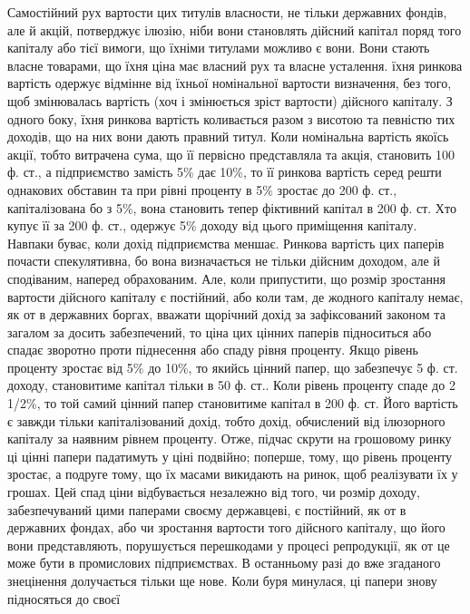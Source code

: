 Самостійний рух вартости цих титулів власности, не тільки державних
фондів, але й акцій, потверджує ілюзію, ніби вони становлять дійсний капітал
поряд того капіталу або тієї вимоги, що їхніми титулами можливо є вони.
Вони стають власне товарами, що їхня ціна має власний рух та власне усталення.
їхня ринкова вартість одержує відмінне від їхньої номінальної вартости
визначення, без того, щоб змінювалась вартість (хоч і змінюється зріст вартости)
дійсного капіталу. З одного боку, їхня ринкова вартість коливається разом з
висотою та певністю тих доходів, що на них вони дають правний титул. Коли
номінальна вартість якоїсь акції, тобто витрачена сума, що її первісно представляла
та акція, становить 100 ф. ст., а підприємство замість 5\% дає 10\%,
то її ринкова вартість серед решти однакових обставин та при рівні проценту
в 5\% зростає до 200 ф. ст., капіталізована бо з 5\%, вона становить тепер фіктивний
капітал в 200 ф. ст. Хто купує її за 200 ф. ст., одержує 5\% доходу
від цього приміщення капіталу. Навпаки буває, коли дохід підприємства меншає.
Ринкова вартість цих паперів почасти спекулятивна, бо вона визначається не
тільки дійсним доходом, але й сподіваним, наперед обрахованим. Але, коли припустити,
що розмір зростання вартости дійсного капіталу є постійний, або коли там,
де жодного капіталу немає, як от в державних боргах, вважати щорічний дохід
за зафіксований законом та загалом за досить забезпечений, то ціна цих цінних
паперів підноситься або спадає зворотно проти піднесення або спаду
рівня проценту. Якщо рівень проценту зростає від 5\% до 10\%, то якийсь
цінний папер, що забезпечує 5 ф. ст. доходу, становитиме капітал тільки
в 50 ф. ст.. Коли рівень проценту спаде до 2 1/2\%, то той самий цінний
папер становитиме капітал в 200 ф. ст. Його вартість є завжди тільки капіталізований
дохід, тобто дохід, обчислений від ілюзорного капіталу за наявним
рівнем проценту. Отже, підчас скрути на грошовому ринку ці цінні папери
падатимуть у ціні подвійно; поперше, тому, що рівень проценту зростає, а подруге
тому, що їх масами викидають на ринок, щоб реалізувати їх у грошах.
Цей спад ціни відбувається незалежно від того, чи розмір доходу, забезпечуваний
цими паперами своєму державцеві, є постійний, як от в державних фондах,
або чи зростання вартости того дійсного капіталу, що його вони представляють,
порушується перешкодами у процесі репродукції, як от це може бути в промислових
підприємствах. В останньому разі до вже згаданого знецінення долучається
тільки ще нове. Коли буря минулася, ці папери знову підносяться до своєї
